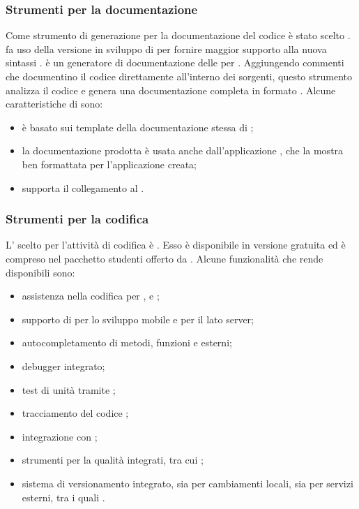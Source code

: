 \subsubsection{Strumenti per la documentazione}
Come strumento di generazione per la documentazione del codice è stato scelto \textbf{}.\\
 fa uso della versione in sviluppo di \textbf{} per fornire maggior supporto alla nuova sintassi .
 è un generatore di documentazione delle  per . Aggiungendo commenti che documentino il codice direttamente all'interno dei sorgenti, questo strumento analizza il codice e genera una documentazione completa in formato .
Alcune caratteristiche di  sono:
\begin{itemize}
	\item è basato sui template della documentazione stessa di ;
	\item la documentazione prodotta è usata anche dall'applicazione , che la mostra ben formattata per l'applicazione creata;
	\item supporta il collegamento al  .
\end{itemize}

\subsubsection{Strumenti per la codifica}
L' scelto per l'attività di codifica è \textbf{}. Esso è disponibile in versione gratuita ed è compreso nel pacchetto studenti offerto da . Alcune funzionalità che rende disponibili sono:
\begin{itemize}
	\item assistenza nella codifica per ,  e ;
	\item supporto di  per lo sviluppo mobile e  per il lato server;
	\item autocompletamento di metodi, funzioni e  esterni;
	\item debugger integrato;
	\item test di unità tramite ;
	\item tracciamento del codice ;
	\item integrazione con ;
	\item strumenti per la qualità integrati, tra cui ;
	\item sistema di versionamento integrato, sia per cambiamenti locali, sia per servizi esterni, tra i quali .
\end{itemize}

